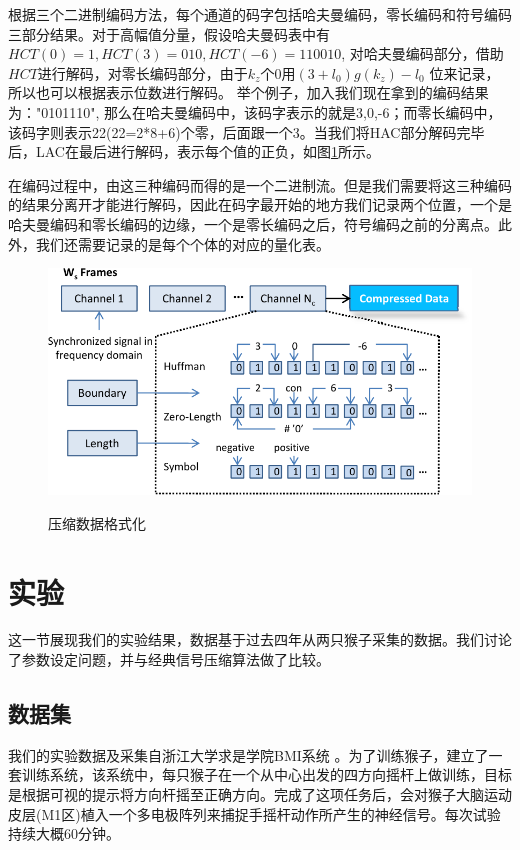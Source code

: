 根据三个二进制编码方法，每个通道的码字包括哈夫曼编码，零长编码和符号编码三部分结果。对于高幅值分量，假设哈夫曼码表中有$HCT(0)=1, HCT(3)=010, HCT(-6)=110010$, 对哈夫曼编码部分，借助$HCT$进行解码，对零长编码部分，由于$k_z$个0用$(3+l_0)g(k_z)- l_0$ 位来记录，所以也可以根据表示位数进行解码。 举个例子，加入我们现在拿到的编码结果为："0101110", 那么在哈夫曼编码中，该码字表示的就是3,0,-6；而零长编码中，该码字则表示22(22=2*8+6)个零，后面跟一个3。当我们将HAC部分解码完毕后，LAC在最后进行解码，表示每个值的正负，如图\ref{fig:Data Format}所示。

在编码过程中，由这三种编码而得的是一个二进制流。但是我们需要将这三种编码的结果分离开才能进行解码，因此在码字最开始的地方我们记录两个位置，一个是哈夫曼编码和零长编码的边缘，一个是零长编码之后，符号编码之前的分离点。此外，我们还需要记录的是每个个体的对应的量化表。


\begin{figure}
  \centering
  \includegraphics{Pictures/Compression/f8-crop.pdf}\\
  \caption{压缩数据格式化}\label{fig:Data Format}
\end{figure}





\section{实验}
这一节展现我们的实验结果，数据基于过去四年从两只猴子采集的数据。我们讨论了参数设定问题，并与经典信号压缩算法做了比较。

\subsection{数据集}

我们的实验数据及采集自浙江大学求是学院BMI系统 \cite{14}。为了训练猴子，建立了一套训练系统，该系统中，每只猴子在一个从中心出发的四方向摇杆上做训练，目标是根据可视的提示将方向杆摇至正确方向。完成了这项任务后，会对猴子大脑运动皮层(M1区)植入一个多电极阵列来捕捉手摇杆动作所产生的神经信号。每次试验持续大概60分钟。

